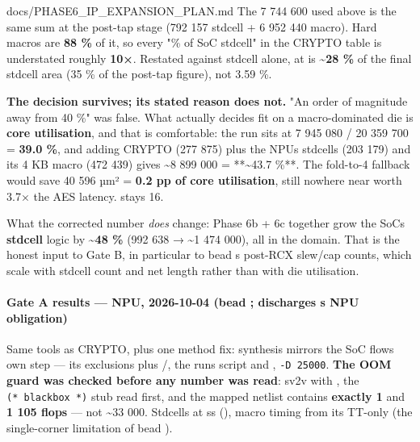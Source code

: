 \begin{relocated}{docs/PHASE6_IP_EXPANSION_PLAN.md}
The 7 744 600 used above is the same sum at the post-tap stage (792 157
stdcell + 6 952 440 macro). Hard macros are \textbf{88 \%} of it, so
every "\% of SoC stdcell" in the CRYPTO table is understated roughly
\textbf{10×}. Restated against stdcell alone,  at
 is \textbf{\textasciitilde28 \%} of the final
stdcell area (35 \% of the post-tap figure), not 3.59 \%.

\textbf{The decision survives; its stated reason does not.} "An order of
magnitude away from 40 \%" was false. What actually decides fit on a
macro-dominated die is \textbf{core utilisation}, and that is
comfortable: the run sits at 7 945 080 / 20 359 700 = \textbf{39.0 \%},
and adding CRYPTO (277 875) plus the NPU\textquotesingle s stdcells (203
179) and its 4 KB macro (472 439) gives \textasciitilde8 899 000 =
**\textasciitilde43.7 \%**. The fold-to-4 fallback would save 40 596 µm²
= \textbf{0.2 pp of core utilisation}, still nowhere near worth 3.7× the
AES latency.  stays 16.

What the corrected number \emph{does} change: Phase 6b + 6c together
grow the SoC\textquotesingle s \textbf{stdcell} logic by
\textasciitilde{}\textbf{48 \%} (992 638 → \textasciitilde1 474 000),
all in the  domain. That is the honest input to Gate B,
in particular to bead \textquotesingle s post-RCX slew/cap
counts, which scale with stdcell count and net length rather than with
die utilisation.

\paragraph{\texorpdfstring{Gate A results --- NPU, 2026-10-04 (bead
; discharges \textquotesingle s NPU
obligation)}{Gate A results --- NPU, 2026-10-04 (bead ; discharges \textquotesingle s NPU obligation)}}\label{ds:ch:phase6-ip-expansion-plan:gate-a-results-npu-2026-10-04-bead-f7vs11-discharges-f7vs13s-npu-obligation}

Same tools as CRYPTO, plus one method fix: synthesis mirrors the SoC
flow\textquotesingle s own  step --- its
 exclusions plus /,
the run\textquotesingle s  script and
, \texttt{-\allowbreak{}D\ 25000}. \textbf{The
OOM guard was checked before any number was read}: sv2v with
, the \texttt{(*\ blackbox\ *)} stub read
first, and the mapped netlist contains \textbf{exactly 1}
 and \textbf{1 105 flops} ---
not \textasciitilde33 000. Stdcells at ss
(), macro timing from its TT-only
 (the single-corner limitation of bead ).


\end{relocated}
